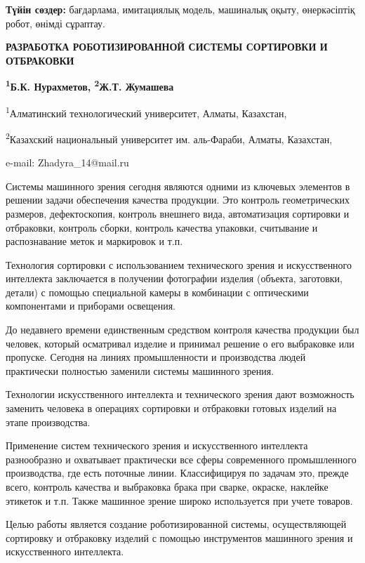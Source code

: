 {\bfseries Түйін сөздер:} бағдарлама, имитациялық модель, машиналық оқыту,
өнеркәсіптіқ робот, өнімді сұраптау.

\begin{articleheader}
{\bfseries РАЗРАБОТКА РОБОТИЗИРОВАННОЙ СИСТЕМЫ СОРТИРОВКИ И ОТБРАКОВКИ}

{\bfseries
\textsuperscript{1}Б.К. Нурахметов,
\textsuperscript{2}Ж.Т. Жумашева\textsuperscript{\envelope }
}
\end{articleheader}

\begin{affiliation}
\textsuperscript{1}Алматинский технологический университет, Алматы, Казахстан,

\textsuperscript{2}Казахский национальный университет им. аль-Фараби, Алматы, Казахстан,

e-mail: Zhadyra\_14@mail.ru
\end{affiliation}

Системы машинного зрения сегодня являются одними из ключевых элементов в
решении задачи обеспечения качества продукции. Это контроль
геометрических размеров, дефектоскопия, контроль внешнего вида,
автоматизация сортировки и отбраковки, контроль сборки, контроль
качества упаковки, считывание и распознавание меток и маркировок и т.п.

Технология сортировки с использованием технического зрения и
искусственного интеллекта заключается в получении фотографии изделия
(объекта, заготовки, детали) с помощью специальной камеры в комбинации с
оптическими компонентами и приборами освещения.

До недавнего времени единственным средством контроля качества продукции
был человек, который осматривал изделие и принимал решение о его
выбраковке или пропуске. Сегодня на линиях промышленности и производства
людей практически полностью заменили системы машинного зрения.

Технологии искусственного интеллекта и технического зрения дают
возможность заменить человека в операциях сортировки и отбраковки
готовых изделий на этапе производства.

Применение систем технического зрения и искусственного интеллекта
разнообразно и охватывает практически все сферы современного
промышленного производства, где есть поточные линии. Классифицируя по
задачам это, прежде всего, контроль качества и выбраковка брака при
сварке, окраске, наклейке этикеток и т.п. Также машинное зрение широко
используется при учете товаров.

Целью работы является создание роботизированной системы, осуществляющей
сортировку и отбраковку изделий с помощью инструментов машинного зрения
и искусственного интеллекта.

